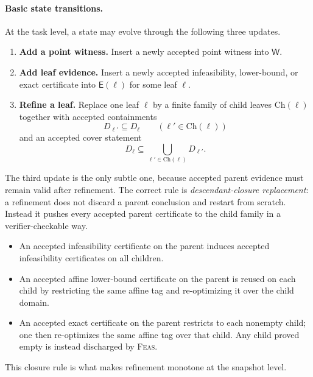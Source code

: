 \paragraph{Basic state transitions.}
At the task level, a state may evolve through the following three updates.
\begin{enumerate}
    \item \textbf{Add a point witness.} Insert a newly accepted point witness into $\mathsf W$.
    \item \textbf{Add leaf evidence.} Insert a newly accepted infeasibility, lower-bound, or exact certificate into $\mathsf E(\ell)$ for some leaf $\ell$.
    \item \textbf{Refine a leaf.} Replace one leaf $\ell$ by a finite family of child leaves $\mathrm{Ch}(\ell)$ together with accepted containments
    \[
    D_{\ell'}\subseteq D_\ell
    \qquad (\ell'\in \mathrm{Ch}(\ell))
    \]
    and an accepted cover statement
    \[
    D_\ell\subseteq \bigcup_{\ell'\in \mathrm{Ch}(\ell)} D_{\ell'}.
    \]
\end{enumerate}
The third update is the only subtle one, because accepted parent evidence must remain valid after refinement. The correct rule is \emph{descendant-closure replacement}: a refinement does not discard a parent conclusion and restart from scratch. Instead it pushes every accepted parent certificate to the child family in a verifier-checkable way.
\begin{itemize}
    \item An accepted infeasibility certificate on the parent induces accepted infeasibility certificates on all children.
    \item An accepted affine lower-bound certificate on the parent is reused on each child by restricting the same affine tag and re-optimizing it over the child domain.
    \item An accepted exact certificate on the parent restricts to each nonempty child; one then re-optimizes the same affine tag over that child. Any child proved empty is instead discharged by \textsc{Feas}.
\end{itemize}
This closure rule is what makes refinement monotone at the snapshot level.

